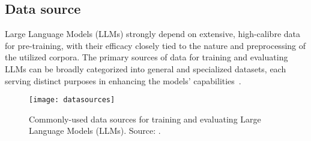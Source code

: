 \subsection{Data source}
\label{subsec:data-source}

Large Language Models (LLMs) strongly depend on extensive, high-calibre data for pre-training, with their efficacy closely tied to the nature and preprocessing of the utilized corpora.
The primary sources of data for training and evaluating LLMs can be broadly categorized into general and specialized datasets, each serving distinct purposes in enhancing the models' capabilities~\cite{survey}.\\

\begin{figure}[h]
	\centering
	\texttt{[image: datasources]}
	\caption{Commonly-used data sources for training and evaluating Large Language Models (LLMs). Source: \textcite{survey}.}
	\label{fig:data_sources}
\end{figure}

